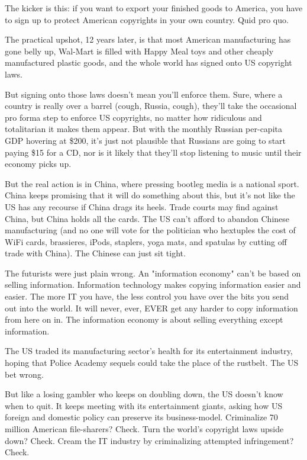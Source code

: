The kicker is this: if you want to export your finished goods to
America, you have to sign up to protect American copyrights in your
own country. Quid pro quo.

The practical upshot, 12 years later, is that most American
manufacturing has gone belly up, Wal-Mart is filled with Happy Meal
toys and other cheaply manufactured plastic goods, and the whole
world has signed onto US copyright laws.

But signing onto those laws doesn't mean you'll enforce them. Sure,
where a country is really over a barrel (cough, Russia, cough),
they'll take the occasional pro forma step to enforce US
copyrights, no matter how ridiculous and totalitarian it makes them
appear. But with the monthly Russian per-capita GDP hovering at
\$200, it's just not plausible that Russians are going to start
paying \$15 for a CD, nor is it likely that they'll stop listening
to music until their economy picks up.

But the real action is in China, where pressing bootleg media is a
national sport. China keeps promising that it will do something
about this, but it's not like the US has any recourse if China
drags its heels. Trade courts may find against China, but China
holds all the cards. The US can't afford to abandon Chinese
manufacturing (and no one will vote for the politician who
hextuples the cost of WiFi cards, brassieres, iPods, staplers, yoga
mats, and spatulas by cutting off trade with China). The Chinese
can just sit tight.

The futurists were just plain wrong. An "information economy" can't
be based on selling information. Information technology makes
copying information easier and easier. The more IT you have, the
less control you have over the bits you send out into the world. It
will never, ever, EVER get any harder to copy information from here
on in. The information economy is about selling everything except
information.

The US traded its manufacturing sector's health for its
entertainment industry, hoping that Police Academy sequels could
take the place of the rustbelt. The US bet wrong.

But like a losing gambler who keeps on doubling down, the US
doesn't know when to quit. It keeps meeting with its entertainment
giants, asking how US foreign and domestic policy can preserve its
business-model. Criminalize 70 million American file-sharers?
Check. Turn the world's copyright laws upside down? Check. Cream
the IT industry by criminalizing attempted infringement? Check.

